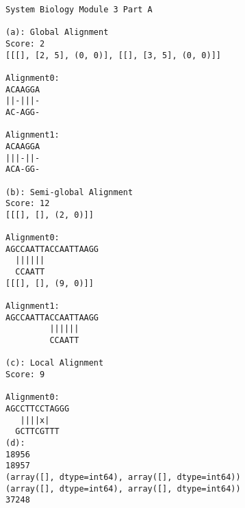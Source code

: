 \documentclass[]{article}
\begin{document}
\begin{verbatim}
System Biology Module 3 Part A

(a): Global Alignment
Score: 2
[[[], [2, 5], (0, 0)], [[], [3, 5], (0, 0)]]

Alignment0:
ACAAGGA
||-|||-
AC-AGG-

Alignment1:
ACAAGGA
|||-||-
ACA-GG-

(b): Semi-global Alignment
Score: 12
[[[], [], (2, 0)]]

Alignment0:
AGCCAATTACCAATTAAGG
  ||||||
  CCAATT
[[[], [], (9, 0)]]

Alignment1:
AGCCAATTACCAATTAAGG
         ||||||
         CCAATT

(c): Local Alignment
Score: 9

Alignment0:
AGCCTTCCTAGGG
   ||||x|
  GCTTCGTTT
(d):
18956
18957
(array([], dtype=int64), array([], dtype=int64))
(array([], dtype=int64), array([], dtype=int64))
37248
\end{verbatim}
\end{document}
